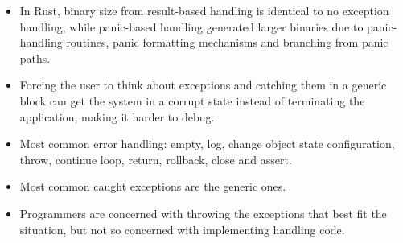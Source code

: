 \documentclass[a4paper,11pt]{article}
\theoremstyle{plain}
\theoremstyle{nonumberplain}
\begin{document}
\begin{itemize}
  \item In Rust, binary size from result-based handling is identical to no exception handling, while panic-based handling generated larger binaries due to panic-handling routines, panic formatting mechanisms and branching from panic paths.
  \item Forcing the user to think about exceptions and catching them in a generic block can get the system in a corrupt state instead of terminating the application, making it harder to debug.
  \item Most common error handling: empty, log, change object state configuration, throw, continue loop, return, rollback, close and assert.
  \item Most common caught exceptions are the generic ones.
  \item Programmers are concerned with throwing the exceptions that best fit the situation, but not so concerned with implementing handling code.
\end{itemize}
\end{document}
